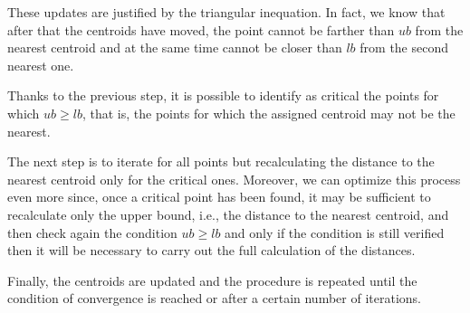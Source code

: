 \documentclass{report}
\begin{document}
\begin{minipage}[b]{0.48\textwidth}
  These updates are justified by the triangular inequation. In fact, we know that after that the centroids have moved, the point cannot be farther than $ub$ from the nearest centroid and at the same time cannot be closer than $lb$ from the second nearest one.

  Thanks to the previous step, it is possible to identify as critical the points for which $ub \geq lb$, that is, the points for which the assigned centroid may not be the nearest.
  
  The next step is to iterate for all points but recalculating the distance to the nearest centroid only for the critical ones. Moreover, we can optimize this process even more since, once a critical point has been found, it may be sufficient to recalculate only the upper bound, i.e., the distance to the nearest centroid, and then check again the condition $ub \geq lb$ and only if the condition is still verified then it will be necessary to carry out the full calculation of the distances.
  
  Finally, the centroids are updated and the procedure is repeated until the condition of convergence is reached or after a certain number of iterations.
\end{minipage}

\newpage
\end{document}
